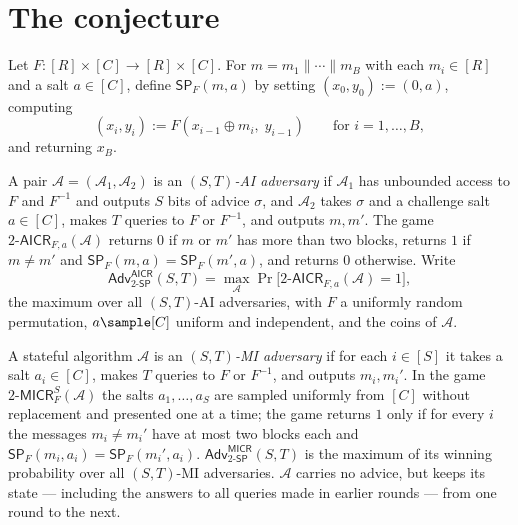 \documentclass{conjura-conjecture}
\newcommand{\SP}{\mathsf{SP}}
\newcommand{\Adv}{\mathsf{Adv}}
\newcommand{\AICR}{\mathsf{AICR}}
\newcommand{\MICR}{\mathsf{MICR}}
\begin{document}
\section{The conjecture}\label{sec:conjectures}

\begin{definition}\label{def:sponge}
Let $F : [R] \times [C] \to [R] \times [C]$. For
$m = m_{1} \| \cdots \| m_{B}$ with each $m_{i} \in [R]$ and a salt
$a \in [C]$, define $\SP_{F}(m,a)$ by setting
$(x_{0}, y_{0}) := (0, a)$, computing
\[
  (x_{i}, y_{i}) := F(x_{i-1} \oplus m_{i},\; y_{i-1})
  \qquad \text{for } i = 1, \dots, B,
\]
and returning $x_{B}$.
\end{definition}

\begin{definition}\label{def:aicr}
A pair $\mathcal{A} = (\mathcal{A}_{1}, \mathcal{A}_{2})$ is an
\emph{$(S,T)$-AI adversary} if $\mathcal{A}_{1}$ has unbounded access
to $F$ and $F^{-1}$ and outputs $S$ bits of advice $\sigma$, and
$\mathcal{A}_{2}$ takes $\sigma$ and a challenge salt $a \in [C]$,
makes $T$ queries to $F$ or $F^{-1}$, and outputs $m, m'$. The game
$2\text{-}\AICR_{F,a}(\mathcal{A})$ returns $0$ if $m$ or $m'$ has more
than two blocks, returns $1$ if $m \ne m'$ and
$\SP_{F}(m,a) = \SP_{F}(m',a)$, and returns $0$ otherwise. Write
\[
  \Adv^{\AICR}_{2\text{-}\SP}(S,T)
  = \max_{\mathcal{A}}
    \Pr\bigl[2\text{-}\AICR_{F,a}(\mathcal{A}) = 1\bigr],
\]
the maximum over all $(S,T)$-AI adversaries, with $F$ a uniformly
random permutation, $a \sample [C]$ uniform and independent, and the
coins of $\mathcal{A}$.
\end{definition}

\begin{definition}\label{def:micr}
A stateful algorithm $\mathcal{A}$ is an \emph{$(S,T)$-MI adversary} if
for each $i \in [S]$ it takes a salt $a_{i} \in [C]$, makes $T$ queries
to $F$ or $F^{-1}$, and outputs $m_{i}, m_{i}'$. In the game
$2\text{-}\MICR^{S}_{F}(\mathcal{A})$ the salts $a_{1}, \dots, a_{S}$
are sampled uniformly from $[C]$ without replacement and presented one
at a time; the game returns $1$ only if for every $i$ the messages
$m_{i} \ne m_{i}'$ have at most two blocks each and
$\SP_{F}(m_{i}, a_{i}) = \SP_{F}(m_{i}', a_{i})$.
$\Adv^{\MICR}_{2\text{-}\SP}(S,T)$ is the maximum of its winning
probability over all $(S,T)$-MI adversaries. $\mathcal{A}$ carries no
advice, but keeps its state --- including the answers to all queries
made in earlier rounds --- from one round to the next.
\end{definition}
\end{document}

